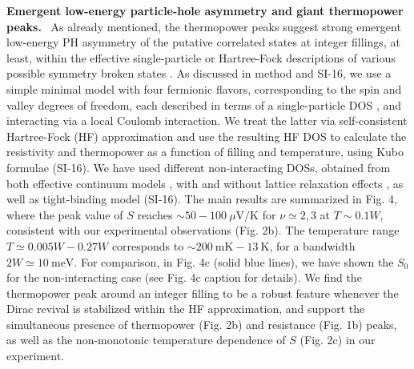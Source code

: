 \documentclass{nature}
\begin{document}
\noindent\textbf{Emergent low-energy particle-hole asymmetry and giant thermopower peaks.}\ 
As already mentioned, the thermopower peaks suggest strong emergent low-energy %
PH asymmetry of the putative correlated states at integer fillings, at least, within the effective single-particle or Hartree-Fock descriptions of various possible symmetry broken states \cite{PhysRevX.8.031089,PhysRevX.10.031034,shavit2021theory}. As discussed in method and SI-16, we use a simple minimal model \cite{zondiner2020cascade} with four fermionic flavors, corresponding to the spin and valley degrees of freedom, each described in terms of a single-particle DOS \cite{zondiner2020cascade,Bistritzer12233,PhysRevX.8.031087}, and interacting via a local Coulomb interaction. We treat the latter via self-consistent Hartree-Fock (HF) approximation and use the resulting HF DOS to calculate the resistivity and thermopower as a function of filling and temperature, using Kubo formulae (SI-16). We have used different non-interacting DOSs, obtained from both effective continuum models \cite{Bistritzer12233,PhysRevX.8.031087}, with and without lattice relaxation effects \cite{PhysRevX.8.031087}, as well as tight-binding model \cite{PhysRevB.85.195458} (SI-16). The main results are summarized in Fig. 4, where the peak value of $S$ reaches $\sim 50-100~\mu\mathrm{V/K}$ for $\nu\simeq 2,3$ at $T\sim 0.1 W$, consistent with our experimental observations (Fig. 2b). The temperature range $T\simeq 0.005W-0.27W$ corresponds to $\sim 200~\mathrm{mK}-13~\mathrm{K}$, for a bandwidth $2W\simeq 10~\mathrm{meV}$. For comparison, in Fig. 4c (solid blue lines), we have shown the $S_0$ for the non-interacting case (see Fig. 4c caption for details). We find the thermopower peak around an integer filling to be a robust feature whenever the Dirac revival is stabilized within the HF approximation, and support the simultaneous presence of thermopower (Fig. 2b) and resistance (Fig. 1b) peaks, as well as the non-monotonic temperature dependence of $S$ (Fig. 2c) in our experiment.

 
\end{document}

